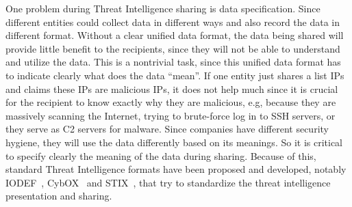 One problem during Threat Intelligence sharing is data specification.
Since different entities could collect data in different ways and
also record the data in different format. Without a clear unified
data format, the data being shared will provide little benefit to
the recipients, since they will not be able to understand and utilize
the data. This is a nontrivial task, since this unified data format
has to indicate clearly what does the data ``mean''. If one entity
just shares a list IPs and claims these IPs are malicious IPs, it
does not help much since it is crucial for the recipient to know
exactly why they are malicious, e.g, because they are massively 
scanning the Internet, trying to brute-force log in to SSH servers,
or they serve as C2 servers for malware. Since companies have different 
security hygiene, they will use the data differently based on its
meanings. So it is critical to specify clearly the meaning of the
data during sharing. Because of this, standard Threat Intelligence 
formats have been proposed and developed, 
notably IODEF~\cite{IODEF}, CybOX~\cite{CybOX} and STIX~\cite{STIX}, 
that try to standardize the threat intelligence presentation and sharing. 


